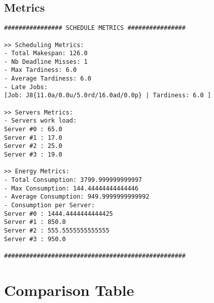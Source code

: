 \documentclass[./report.tex]{subfiles}
\begin{document}
\newpage
\subsection{Metrics}
\begin{lstlisting}[style=txt, caption={Metrics for RMS on multiple servers}]
################ SCHEDULE METRICS ################

>> Scheduling Metrics: 
- Total Makespan: 126.0
- Nb Deadline Misses: 1
- Max Tardiness: 6.0
- Average Tardiness: 6.0
- Late Jobs: 
[Job: J8{11.0a/0.0u/5.0rd/16.0ad/0.0p} | Tardiness: 6.0 ]

>> Servers Metrics: 
- Servers work load:
Server #0 : 65.0
Server #1 : 17.0
Server #2 : 25.0
Server #3 : 19.0

>> Energy Metrics: 
- Total Consumption: 3799.999999999997
- Max Consumption: 144.44444444444446
- Average Consumption: 949.9999999999992
- Consumption per Server: 
Server #0 : 1444.4444444444425
Server #1 : 850.0
Server #2 : 555.5555555555555
Server #3 : 950.0

##################################################
\end{lstlisting}


\newpage
\section{Comparison Table}
\end{document}
